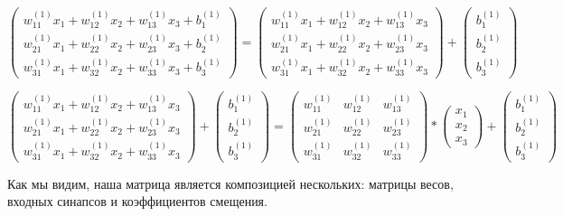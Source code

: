 \documentclass[12pt]{extarticle}
\begin{document}
	\centerline{$\begin{pmatrix}
		w_{11}^{(1)}x_1 + w_{12}^{(1)}x_2  + w_{13}^{(1)}x_3 + b_1^{(1)} \\
		w_{21}^{(1)}x_1 + w_{22}^{(1)}x_2  + w_{23}^{(1)}x_3 + b_2^{(1)} \\
		w_{31}^{(1)}x_1 + w_{32}^{(1)}x_2  + w_{33}^{(1)}x_3 + b_3^{(1)} \end{pmatrix} = \begin{pmatrix}
		w_{11}^{(1)}x_1 + w_{12}^{(1)}x_2  + w_{13}^{(1)}x_3  \\
		w_{21}^{(1)}x_1 + w_{22}^{(1)}x_2  + w_{23}^{(1)}x_3  \\
		w_{31}^{(1)}x_1 + w_{32}^{(1)}x_2  + w_{33}^{(1)}x_3 \end{pmatrix} +\begin{pmatrix}
		b_1^{(1)} \\
		b_2^{(1)} \\
		b_3^{(1)} \end{pmatrix} $}
	
	\centerline{$\begin{pmatrix}
		w_{11}^{(1)}x_1 + w_{12}^{(1)}x_2  + w_{13}^{(1)}x_3  \\
		w_{21}^{(1)}x_1 + w_{22}^{(1)}x_2  + w_{23}^{(1)}x_3  \\
		w_{31}^{(1)}x_1 + w_{32}^{(1)}x_2  + w_{33}^{(1)}x_3 \end{pmatrix} +\begin{pmatrix}
		b_1^{(1)} \\
		b_2^{(1)} \\
		b_3^{(1)} \end{pmatrix} = \begin{pmatrix}
		w_{11}^{(1)} & w_{12}^{(1)} & w_{13}^{(1)}  \\
		w_{21}^{(1)} & w_{22}^{(1)} & w_{23}^{(1)}  \\
		w_{31}^{(1)} & w_{32}^{(1)} & w_{33}^{(1)} \end{pmatrix} * \begin{pmatrix}
		x_1  \\
		x_2\\
		x_3 \end{pmatrix} +\begin{pmatrix}
		b_1^{(1)} \\
		b_2^{(1)} \\
		b_3^{(1)} \end{pmatrix} $}
		
		Как мы видим, наша матрица является композицией нескольких: матрицы весов, входных синапсов и коэффициентов смещения. 
		
\end{document}
